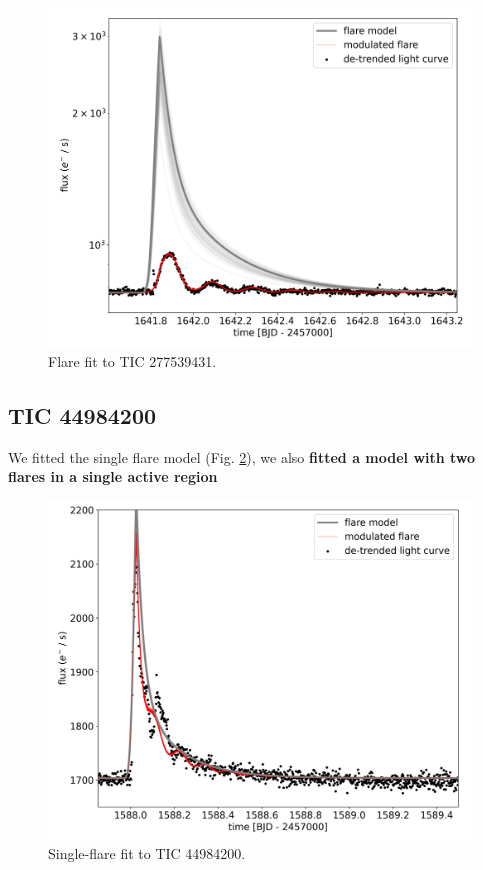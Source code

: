 \documentclass[fleqn,usenatbib,letters]{mnras}%
\newcommand{\FA}{TIC 277539431} %
\newcommand{\FB}{TIC 44984200} %
\begin{document}
\begin{figure}
	\includegraphics[width=\columnwidth]{figures/08_07_2020_11_48_TIC277539431_flarefit_50retrievals.png}
    \caption{Flare fit to \FA.}
    \label{fig:fit\FA}
\end{figure}
\subsection{\FB}
We fitted the single flare model (Fig. \ref{fig:fit\FB}), we also \textbf{fitted a model with two flares in a single active region}
\begin{figure}
	\includegraphics[width=\columnwidth]{figures/02_08_2020_17_44_TIC44984200_flarefit_50retrievals.png}
    \caption{Single-flare fit to \FB.}
    \label{fig:fit\FB}
\end{figure}
\end{document}

